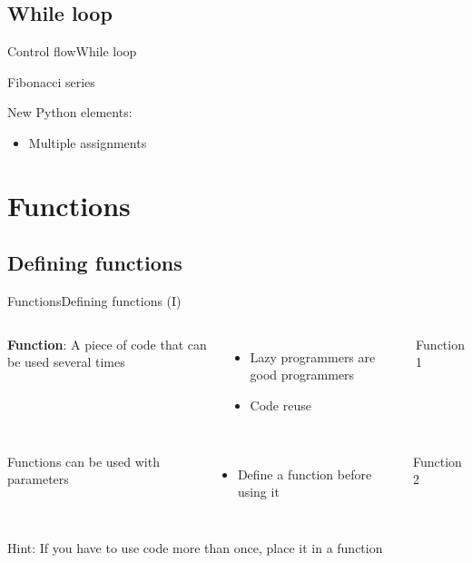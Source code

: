 \documentclass[10pt,compress]{beamer} %
\begin{document}
\subsection{While loop}
\begin{frame}{Control flow}{While loop}
	\begin{exampleblock}{Fibonacci series}
	\vspace{-0.2cm}
		
	\end{exampleblock}

    New Python elements:
	\begin{itemize}
	\item Multiple assignments
	\end{itemize}
\end{frame}


\section{Functions}

\subsection{Defining functions}
\begin{frame}{Functions}{Defining functions (I)}
    \begin{columns}
	\textbf{Function}: A piece of code that can be used several times
		\begin{itemize}
		\item Lazy programmers are good programmers
		\item Code reuse
		\end{itemize}
		\begin{exampleblock}{Function 1}
		\vspace{-0.2cm}
		
		\vspace{-0.2cm}
		\end{exampleblock}
	\end{columns}

    \begin{columns}
	Functions can be used with parameters
		\begin{itemize}
		\item Define a function before using it
		\end{itemize}

		\begin{exampleblock}{Function 2}
		\vspace{-0.2cm}
		
		\vspace{-0.2cm}
		\end{exampleblock}
	\end{columns}
	\bigskip
	\centering \alert{Hint: If you have to use code more than once, place it in a function}
\end{frame}
\end{document}

